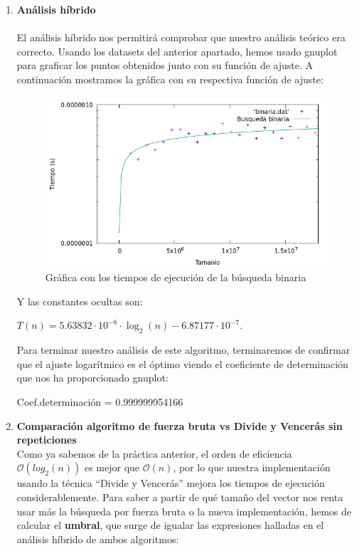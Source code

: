 \documentclass[10pt,a4paper]{article}
\begin{document}
\begin{enumerate}
 \item \textbf{Análisis híbrido}\\
 \\
 El análisis híbrido nos permitirá comprobar que nuestro análisis teórico era correcto. Usando los datasets del anterior apartado, hemos usado gnuplot para graficar los puntos obtenidos junto con su función de ajuste. A continuación mostramos la gráfica con su respectiva función de ajuste:
 
 \begin{figure}[h!]
 	\centering
 	\includegraphics[scale=0.55]{./Images/Grafica_binaria.png}
 	\caption{Gráfica con los tiempos de ejecución de la búsqueda binaria}
 \end{figure}
 
 Y las constantes ocultas son:
 
 \( T(n) = 5.63832 \cdot 10^{-8} \cdot \log_{2}(n) - 6.87177 \cdot 10^{-7}\).
 
 Para terminar nuestro análisis de este algoritmo, terminaremos de confirmar que el ajuste logarítmico es el óptimo viendo el coeficiente de determinación que nos ha proporcionado gnuplot:
 
 Coef.determinación = 0.999999954166
 
 \item \textbf{Comparación algoritmo de fuerza bruta vs Divide y Vencerás sin repeticiones}\\
 
 Como ya sabemos de la práctica anterior, el orden de eficiencia $\mathcal{O}(log_{2}(n))$ es mejor que $\mathcal{O}(n)$, por lo que nuestra implementación usando la técnica ``Divide y Vencerás'' mejora los tiempos de ejecución considerablemente. Para saber a partir de qué tamaño del vector nos renta usar más la búsqueda por fuerza bruta o la nueva implementación, hemos de calcular el \textbf{umbral}, que surge de igualar las expresiones halladas en el análisis híbrido de ambos algoritmos:
 

\end{enumerate}
\end{document}
